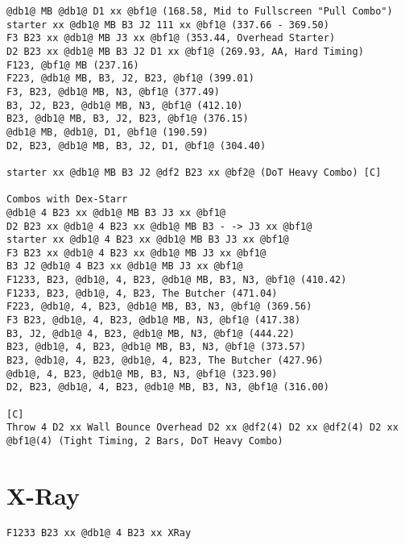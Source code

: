 \documentclass[main.tex]{subfiles}
\begin{document}
\begin{lstlisting}[language=FG]
@db1@ MB @db1@ D1 xx @bf1@ (168.58, Mid to Fullscreen "Pull Combo")
starter xx @db1@ MB B3 J2 111 xx @bf1@ (337.66 - 369.50)
F3 B23 xx @db1@ MB J3 xx @bf1@ (353.44, Overhead Starter)
D2 B23 xx @db1@ MB B3 J2 D1 xx @bf1@ (269.93, AA, Hard Timing)
F123, @bf1@ MB (237.16)
F223, @db1@ MB, B3, J2, B23, @bf1@ (399.01)
F3, B23, @db1@ MB, N3, @bf1@ (377.49)
B3, J2, B23, @db1@ MB, N3, @bf1@ (412.10)
B23, @db1@ MB, B3, J2, B23, @bf1@ (376.15)
@db1@ MB, @db1@, D1, @bf1@ (190.59)
D2, B23, @db1@ MB, B3, J2, D1, @bf1@ (304.40)

starter xx @db1@ MB B3 J2 @df2 B23 xx @bf2@ (DoT Heavy Combo) [C]

Combos with Dex-Starr
@db1@ 4 B23 xx @db1@ MB B3 J3 xx @bf1@ 
D2 B23 xx @db1@ 4 B23 xx @db1@ MB B3 - -> J3 xx @bf1@
starter xx @db1@ 4 B23 xx @db1@ MB B3 J3 xx @bf1@
F3 B23 xx @db1@ 4 B23 xx @db1@ MB J3 xx @bf1@
B3 J2 @db1@ 4 B23 xx @db1@ MB J3 xx @bf1@ 
F1233, B23, @db1@, 4, B23, @db1@ MB, B3, N3, @bf1@ (410.42)
F1233, B23, @db1@, 4, B23, The Butcher (471.04)
F223, @db1@, 4, B23, @db1@ MB, B3, N3, @bf1@ (369.56)
F3 B23, @db1@, 4, B23, @db1@ MB, N3, @bf1@ (417.38)
B3, J2, @db1@ 4, B23, @db1@ MB, N3, @bf1@ (444.22)
B23, @db1@, 4, B23, @db1@ MB, B3, N3, @bf1@ (373.57)
B23, @db1@, 4, B23, @db1@, 4, B23, The Butcher (427.96)
@db1@, 4, B23, @db1@ MB, B3, N3, @bf1@ (323.90)
D2, B23, @db1@, 4, B23, @db1@ MB, B3, N3, @bf1@ (316.00)

[C]
Throw 4 D2 xx Wall Bounce Overhead D2 xx @df2(4) D2 xx @df2(4) D2 xx @bf1@(4) (Tight Timing, 2 Bars, DoT Heavy Combo)
\end{lstlisting}





\section{X-Ray}
\begin{lstlisting}[language=FG]
F1233 B23 xx @db1@ 4 B23 xx XRay
\end{lstlisting}
\end{document}
